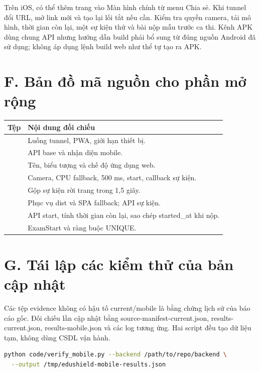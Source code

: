 Trên iOS, có thể thêm trang vào Màn hình chính từ menu Chia sẻ. Khi tunnel đổi URL, mở link mới và tạo lại lối tắt nếu cần. Kiểm tra quyền camera, tải mô hình, thời gian còn lại, một sự kiện thử và bài nộp mẫu trước ca thi. Kênh APK dùng chung API nhưng hướng dẫn build phải bổ sung từ đúng nguồn Android đã sử dụng; không áp dụng lệnh build web như thể tự tạo ra APK.

\clearpage
\section*{F. Bản đồ mã nguồn cho phần mở rộng}
\begin{longtable}{@{}L{6cm}L{9cm}@{}}
\toprule Tệp & Nội dung đối chiếu \\\midrule
{} & Luồng tunnel, PWA, giới hạn thiết bị.\\
 & API base và nhận diện mobile.\\
 & Tên, biểu tượng và chế độ ứng dụng web.\\
 & Camera, CPU fallback, 500 ms, start, callback sự kiện.\\
 & Gộp sự kiện rời trang trong 1,5 giây.\\
 & Phục vụ dist và SPA fallback; API sự kiện.\\
 & API start, tính thời gian còn lại, sao chép started\_at khi nộp.\\
 & ExamStart và ràng buộc UNIQUE.\\
\bottomrule
\end{longtable}

\section*{G. Tái lập các kiểm thử của bản cập nhật}
Các tệp evidence không có hậu tố current/mobile là bằng chứng lịch sử của báo cáo gốc. Đối chiếu lần cập nhật bằng source-manifest-current.json, results-current.json, results-mobile.json và các log tương ứng. Hai script đều tạo dữ liệu tạm, không dùng CSDL vận hành.
\begin{lstlisting}[language=bash]
python code/verify_mobile.py --backend /path/to/repo/backend \
  --output /tmp/edushield-mobile-results.json
\end{lstlisting}
